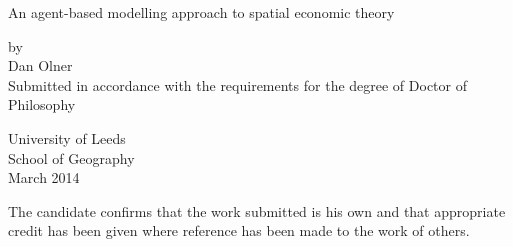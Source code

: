 %
%

\vspace*{1cm}
\begin{center}



{\Huge An agent-based modelling approach to spatial economic theory\vspace{1.5cm}\\}

{\Large by\\Dan Olner\vspace{1.5cm}\\




Submitted in accordance with the requirements for the degree of Doctor of Philosophy\vspace{2cm}\\


\null
\vfill

University of Leeds\\ 
School of Geography\\
March 2014\\
}


\end{center}

\clearpage{\pagestyle{empty}\cleardoublepage}

\thispagestyle{empty}

\null
\vfill

The candidate confirms that the work submitted is his own and that appropriate credit has been given where reference has been made to the work of others.

\vspace{1cm}\\



